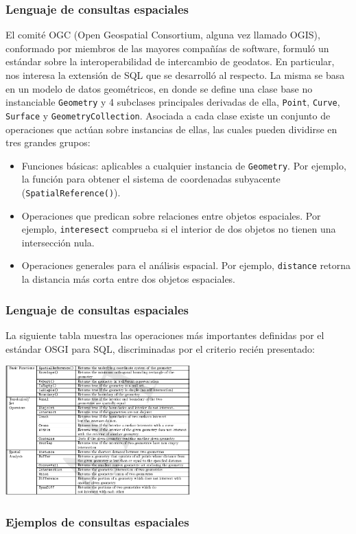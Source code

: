 \begin{frame}
		\frametitle{Lenguaje de consultas espaciales}
		El comité OGC (Open Geospatial Consortium, alguna vez llamado OGIS), conformado por miembros de las mayores compañías de software, formuló un estándar sobre la interoperabilidad de intercambio de geodatos. En particular, nos interesa la extensión de SQL que se desarrolló al respecto. \pause
		La misma se basa en un modelo de datos geométricos, en donde se define una clase base no instanciable \texttt{Geometry} y 4 subclases principales derivadas de ella, \texttt{Point}, \texttt{Curve}, \texttt{Surface} y \texttt{GeometryCollection}.
		Asociada a cada clase existe un conjunto de operaciones que actúan sobre instancias de ellas, las cuales pueden dividirse en tres grandes grupos: \\ \pause
		\begin{itemize}
			\item Funciones básicas: aplicables a cualquier instancia de \texttt{Geometry}. Por ejemplo, la función para obtener el sistema de coordenadas subyacente (\texttt{SpatialReference()}).
			\item Operaciones que predican sobre relaciones entre objetos espaciales. Por ejemplo, \texttt{interesect} comprueba si el interior de dos objetos no tienen una intersección nula.
			\item Operaciones generales para el análisis espacial. Por ejemplo, \texttt{distance} retorna la distancia más corta entre dos objetos espaciales.
		\end{itemize}
\end{frame}

\begin{frame}
		\frametitle{Lenguaje de consultas espaciales}
		La siguiente tabla muestra las operaciones más importantes definidas por el estándar OSGI para SQL, discriminadas por el criterio recién presentado: \\
	\begin{center}
	\includegraphics[height=5cm]{tablaOGIS.png}
	\end{center}
\end{frame}

\begin{frame}
		\frametitle{Ejemplos de consultas espaciales}
\end{frame}
